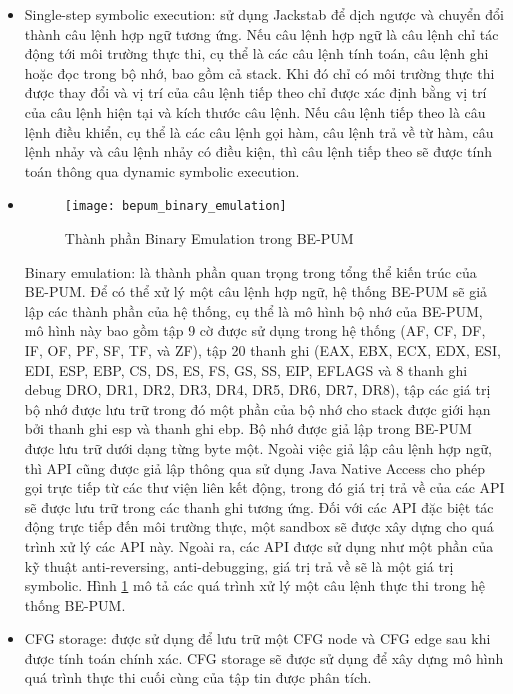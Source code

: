 \begin{itemize}
\item{Single-step symbolic execution: sử dụng Jackstab để dịch ngược và chuyển đổi thành câu lệnh hợp ngữ tương ứng. Nếu câu lệnh hợp ngữ là câu lệnh chỉ tác động tới môi trường thực thi, cụ thể là các câu lệnh tính toán, câu lệnh ghi hoặc đọc trong bộ nhớ, bao gồm cả stack. Khi đó chỉ có môi trường thực thi được thay đổi và vị trí của câu lệnh tiếp theo chỉ được xác định bằng vị trí của câu lệnh hiện tại và kích thước câu lệnh. Nếu câu lệnh tiếp theo là câu lệnh điều khiển, cụ thể là các câu lệnh gọi hàm, câu lệnh trả về từ hàm, câu lệnh nhảy và câu lệnh nhảy có điều kiện, thì câu lệnh tiếp theo sẽ được tính toán thông qua dynamic symbolic execution.\\}
\item{
\begin{figure}[h]
\centering
\texttt{[image: bepum\_binary\_emulation]}
\caption{Thành phần Binary Emulation trong BE-PUM}
\label{fig:BepumBE}
\end{figure}
Binary emulation: là thành phần quan trọng trong tổng thể kiến trúc của BE-PUM. Để có thể xử lý một câu lệnh hợp ngữ, hệ thống BE-PUM sẽ giả lập các thành phần của hệ thống, cụ thể là mô hình bộ nhớ của BE-PUM, mô hình này bao gồm tập 9 cờ được sử dụng trong hệ thống (AF, CF, DF, IF, OF, PF, SF, TF, và ZF), tập 20 thanh ghi (EAX, EBX, ECX, EDX, ESI, EDI, ESP, EBP, CS, DS, ES, FS, GS, SS, EIP, EFLAGS và 8 thanh ghi debug DRO, DR1, DR2, DR3, DR4, DR5, DR6, DR7, DR8), tập các giá trị bộ nhớ được lưu trữ trong đó một phần của bộ nhớ cho stack được giới hạn bởi thanh ghi esp và thanh ghi ebp. Bộ nhớ được giả lập trong BE-PUM được lưu trữ dưới dạng từng byte một. Ngoài việc giả lập câu lệnh hợp ngữ, thì API cũng được giả lập thông qua sử dụng Java Native Access cho phép gọi trực tiếp từ các thư viện liên kết động, trong đó giá trị trả về của các API sẽ được lưu trữ trong các thanh ghi tương ứng. Đối với các API đặc biệt tác động trực tiếp đến môi trường thực, một sandbox sẽ được xây dựng cho quá trình xử lý các API này. Ngoài ra, các API được sử dụng như một phần của kỹ thuật anti-reversing, anti-debugging, giá trị trả về sẽ là một giá trị symbolic. Hình \ref {fig:BepumBE} mô tả các quá trình xử lý một câu lệnh thực thi trong hệ thống BE-PUM.\\
}
\item{CFG storage: được sử dụng để lưu trữ một CFG node và CFG edge sau khi được tính toán chính xác. CFG storage sẽ được sử dụng để xây dựng mô hình quá trình thực thi cuối cùng của tập tin được phân tích.}
\end{itemize}

